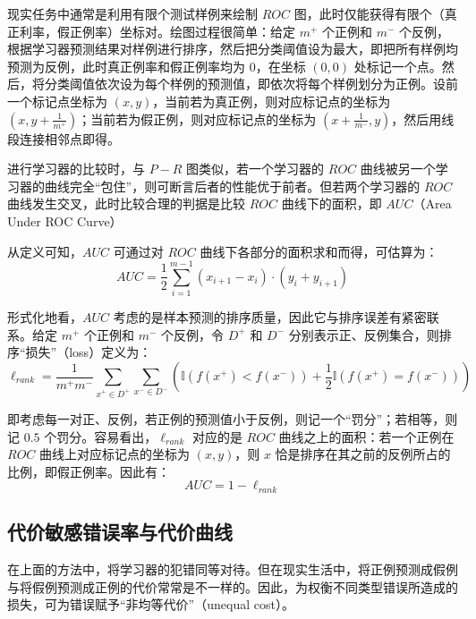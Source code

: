 \documentclass[12pt, a4paper]{article} %
\begin{document}
现实任务中通常是利用有限个测试样例来绘制 $ROC$ 图，此时仅能获得有限个（真正利率，假正例率）坐标对。绘图过程很简单：给定 $m^+$ 个正例和 $m^-$ 个反例，根据学习器预测结果对样例进行排序，然后把分类阈值设为最大，即把所有样例均预测为反例，此时真正例率和假正例率均为 $0$，在坐标 $(0, 0)$ 处标记一个点。然后，将分类阈值依次设为每个样例的预测值，即依次将每个样例划分为正例。设前一个标记点坐标为 $(x, y)$，当前若为真正例，则对应标记点的坐标为 $\displaystyle (x, y + \frac{1}{m^+})$；当前若为假正例，则对应标记点的坐标为 $\displaystyle (x + \frac{1}{m^-}, y)$，然后用线段连接相邻点即得。

进行学习器的比较时，与 $P-R$ 图类似，若一个学习器的 $ROC$ 曲线被另一个学习器的曲线完全“包住”，则可断言后者的性能优于前者。但若两个学习器的 $ROC$ 曲线发生交叉，此时比较合理的判据是比较 $ROC$ 曲线下的面积，即 $AUC$（Area Under ROC Curve）

从定义可知，$AUC$ 可通过对 $ROC$ 曲线下各部分的面积求和而得，可估算为：
\begin{equation*}
    AUC = \frac{1}{2} \sum_{i = 1}^{m - 1} (x_{i + 1} - x_i) \cdot (y_i + y_{i + 1})
\end{equation*}

形式化地看，$AUC$ 考虑的是样本预测的排序质量，因此它与排序误差有紧密联系。给定 $m^+$ 个正例和 $m^-$ 个反例，令 $D^+$ 和 $D^-$ 分别表示正、反例集合，则排序“损失”（loss）定义为：
\begin{equation*}
    \ell_{rank} = \frac{1}{m^+ m^-} \sum_{x^+ \in D^+} \sum_{x^- \in D^-} \left(\mathbb{I} (f(x^+) < f(x^-)) + \frac{1}{2} \mathbb{I} (f(x^+) = f(x^-)) \right)
\end{equation*}

即考虑每一对正、反例，若正例的预测值小于反例，则记一个“罚分”；若相等，则记 $0.5$ 个罚分。容易看出，$\ell_{rank}$ 对应的是 $ROC$ 曲线之上的面积：若一个正例在 $ROC$ 曲线上对应标记点的坐标为 $(x, y)$，则 $x$ 恰是排序在其之前的反例所占的比例，即假正例率。因此有：
\begin{equation*}
    AUC = 1 - \ell_{rank}
\end{equation*}

\subsection{代价敏感错误率与代价曲线}

在上面的方法中，将学习器的犯错同等对待。但在现实生活中，将正例预测成假例与将假例预测成正例的代价常常是不一样的。因此，为权衡不同类型错误所造成的损失，可为错误赋予“非均等代价”（unequal cost）。
\end{document}
